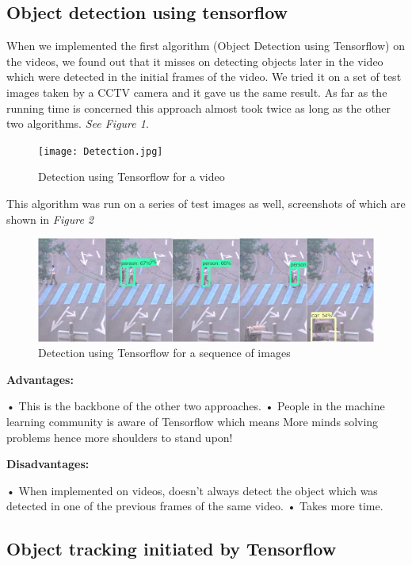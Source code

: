 \documentclass[10pt,twocolumn,letterpaper]{article}
\begin{document}
\subsection{Object detection using tensorflow}  

When we implemented the first algorithm (Object Detection using Tensorflow) on the videos, we found out that it misses on detecting objects later in the video which were detected in the initial frames of the video. We tried it on a set of test images taken by a CCTV camera and it gave us the same result. As far as the running time is concerned this approach almost took twice as long as the other two algorithms. \textit{See Figure 1}.

\begin{figure}
\texttt{[image: Detection.jpg]}
\caption{Detection using Tensorflow for a video }
\end{figure}

This algorithm was run on a series of test images as well, screenshots of which are shown in \textit{Figure 2}

\begin{figure}
\includegraphics[width=\linewidth]{Detection_images.jpg}
\caption{Detection using Tensorflow for a sequence of images}
\end{figure}

\textbf{Advantages:}

•	This is the backbone of the other two approaches.
•	People in the machine learning community is aware of Tensorflow which means More minds solving problems hence more shoulders to stand upon!

\textbf{Disadvantages:}

•	When implemented on videos, doesn’t always detect the object which was detected in one of the previous frames of the same video. 
•	Takes more time.

\subsection{Object tracking initiated by Tensorflow}  
\end{document}

